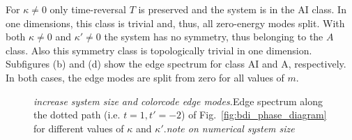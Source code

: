 \documentclass[twocolumn,amsmath,longbibliography,amssymb,superscriptaddress]{revtex4-1}
\newcommand{\mariac}[1]{{\it\color{cyan}#1}}
\begin{document}
For $\kappa \neq 0$ only time-reversal $T$ is preserved and the system is in the AI class. 
In one dimensions, this class is trivial and, thus,  all zero-energy modes split. 
With both $\kappa \neq 0$ and $\kappa' \neq0$ the system has no symmetry, thus belonging to the $A$ class.  
Also this symmetry class is topologically trivial in one dimension. 
Subfigures (b) and (d) show the edge spectrum for class AI and A, respectively. In both cases, the edge modes are split from zero for all values of $m$.


%

\begin{figure}[h!]
\centering

\hspace{0mm}

\caption{\mariac{increase system size and colorcode edge modes.}Edge spectrum along the dotted path (i.e. $t=1,t'=-2$) of Fig.~\ref{fig:bdi_phase_diagram} for different values of $\kappa$ and $\kappa'$.\mariac{note on numerical system size}}
\label{fig:zero_E_modes}
\end{figure}
\end{document}
